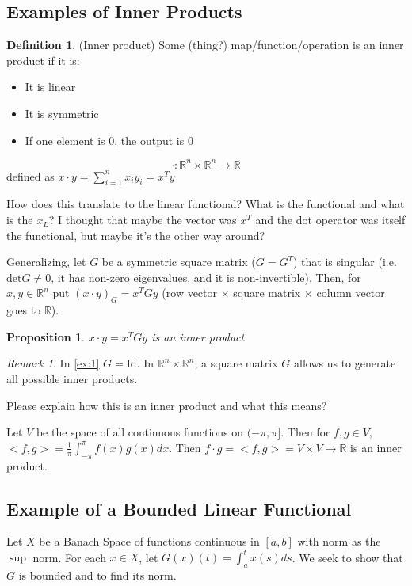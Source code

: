 \documentclass[12pt]{article}
\newcommand{\R}{\mathbb{R}}
\newtheorem{proposition}{Proposition}[theorem]
\theoremstyle{definition}
\newtheorem{definition}{Definition}[section]
\theoremstyle{remark}
\newtheorem*{remark}{Remark}
\newenvironment{question}[2][QUESTION]{\begin{trivlist}
\item[\hskip \labelsep {\bfseries #1}\hskip \labelsep {\bfseries #2.}]}{\end{trivlist}}
\begin{document}
\subsection{Examples of Inner Products}
\begin{definition}
   (Inner product) Some (thing?) map/function/operation is an inner product if it is:
   \begin{itemize}
    \item It is linear
    \item It is symmetric
    \item If one element is $0$, the output is $0$
   \end{itemize}
\end{definition}
\begin{enumerate}
   \item \label{ex:1}$$\cdot: \R^n\times \R^n\to\R$$ defined as $x\cdot y=\sum^n_{i=1}x_iy_i=x^Ty$
\begin{question}{4}
    How does this translate to the linear functional? What is the functional and what is the $x_L$? I thought that maybe the vector was $x^T$ and the dot operator was itself the functional, but maybe it's the other way around?
\end{question}
    \item Generalizing, let $G$ be a symmetric square matrix ($G=G^T$) that is singular (i.e. $\text{det}G\not=0$, it has non-zero eigenvalues, and it is non-invertible). Then, for $x,y\in \R^n$ put $(x\cdot y)_G=x^TGy$ (row vector $\times$ square matrix $\times$ column vector goes to $\R$).
    \begin{proposition}
        $x\cdot y=x^TGy$ is an inner product. 
    \end{proposition}
    \begin{remark}
       In \ref{ex:1} $G=\text{Id}$. In $\R^n\times\R^n$, a square matrix $G$ allows us to generate all possible inner products.
    \end{remark}
    \begin{question}{5}
       Please explain how this is an inner product and what this means? \vspace{2in}
    \end{question}
    \item Let $V$ be the space of all continuous functions on $(-\pi,\pi]$. Then for $f,g\in V$, $<f,g> =\frac{1}{\pi}\int^\pi_{-\pi} f(x)g(x)dx$.
    Then $f\cdot g= <f, g> =V\times V\to \R$ is an inner product.
\end{enumerate}
\subsection{Example of a Bounded Linear Functional}
Let $X$ be a Banach Space of functions continuous in $[a,b]$ with norm as the $\sup$ norm. For each $x\in X$, let $G(x)(t)=\int^t_ax(s)ds$. We seek to show that $G$ is bounded and to find its norm.
\end{document}
